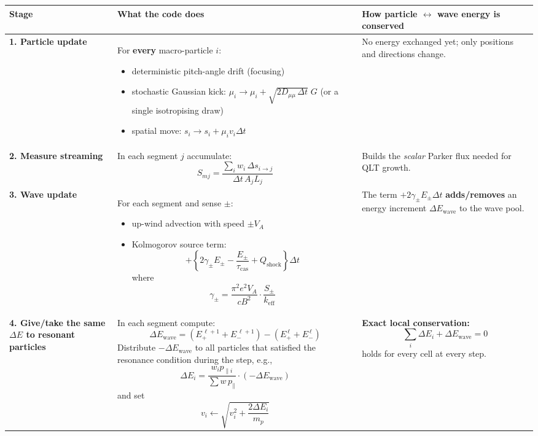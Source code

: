 {\begin{table}[h!]
\centering
\renewcommand{\arraystretch}{1.4}
\begin{tabular}{|p{3.5cm}|p{8cm}|p{5.5cm}|}
\hline
\textbf{Stage} & \textbf{What the code does} & \textbf{How particle $\leftrightarrow$ wave energy is conserved} \\
\hline
\textbf{1. Particle update} &
For \textbf{every} macro-particle $i$:
\begin{itemize}
  \item deterministic pitch-angle drift (focusing)
  \item stochastic Gaussian kick: $\mu_i \to \mu_i + \sqrt{2 D_{\mu\mu} \, \Delta t}\;G$ (or a single isotropising draw)
  \item spatial move: $s_i \to s_i + \mu_i v_i \Delta t$
\end{itemize} &
No energy exchanged yet; only positions and directions change. \\
\hline

\textbf{2. Measure streaming} &
In each segment $j$ accumulate:
\[
S_{mj} = \frac{\sum_i w_i\, \Delta s_{i \to j}}{\Delta t\, A_j L_j}
\] &
Builds the \textit{scalar} Parker flux needed for QLT growth. \\
\hline

\textbf{3. Wave update} &
For each segment and sense $\pm$:
\begin{itemize}
  \item up-wind advection with speed $\pm V_A$
  \item Kolmogorov source term:
  \[
  +\left\{ 2\gamma_\pm E_\pm - \frac{E_\pm}{\tau_{\mathrm{cas}}} + Q_{\mathrm{shock}} \right\}\Delta t
  \]
  where
  \[
  \gamma_\pm = \frac{\pi^2 e^2 V_A}{c B^2} \cdot \frac{S_\pm}{k_{\mathrm{eff}}}
  \]
\end{itemize} &
The term $+2\gamma_\pm E_\pm \Delta t$ \textbf{adds/removes} an energy increment $\Delta E_{\mathrm{wave}}$ to the wave pool. \\
\hline

\textbf{4. Give/take the same $\Delta E$ to resonant particles} &
In each segment compute:
\[
\Delta E_{\mathrm{wave}} = (E_+^{\,\ell+1} + E_-^{\,\ell+1}) - (E_+^{\,\ell} + E_-^{\,\ell})
\]
Distribute $-\Delta E_{\mathrm{wave}}$ to all particles that satisfied the resonance condition during the step, e.g.,
\[
\Delta E_i = \frac{w_i p_{\parallel i}}{\sum w\, p_{\parallel}} \cdot (-\Delta E_{\mathrm{wave}})
\]
and set
\[
v_i \leftarrow \sqrt{v_i^2 + \frac{2\Delta E_i}{m_p}}
\] &
\textbf{Exact local conservation:} \[
\sum_i \Delta E_i + \Delta E_{\mathrm{wave}} = 0
\]
holds for every cell at every step. \\
\hline
\end{tabular}
\end{table}

}
